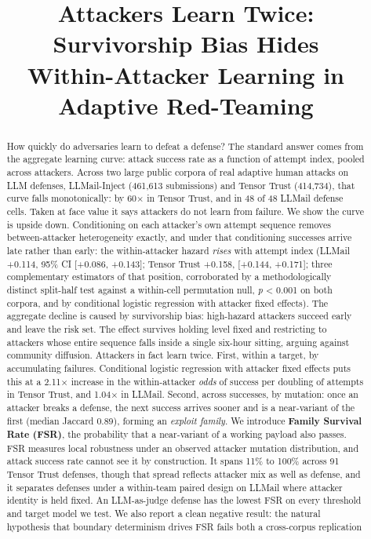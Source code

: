 \documentclass[conference]{IEEEtran}
\begin{document}
\title{Attackers Learn Twice: Survivorship Bias Hides\\ Within-Attacker Learning in Adaptive Red-Teaming}

\author{
}

\maketitle

\begin{abstract}
How quickly do adversaries learn to defeat a defense? The standard answer comes from the aggregate learning curve: attack success rate as a function of attempt index, pooled across attackers. Across two large public corpora of real adaptive human attacks on LLM defenses, LLMail-Inject (461,613 submissions) and Tensor Trust (414,734), that curve falls monotonically: by 60$\times$ in Tensor Trust, and in 48 of 48 LLMail defense cells. Taken at face value it says attackers do not learn from failure. We show the curve is upside down. Conditioning on each attacker's own attempt sequence removes between-attacker heterogeneity exactly, and under that conditioning successes arrive late rather than early: the within-attacker hazard \textit{rises} with attempt index (LLMail +0.114, 95\% CI [+0.086, +0.143]; Tensor Trust +0.158, [+0.144, +0.171]; three complementary estimators of that position, corroborated by a methodologically distinct split-half test against a within-cell permutation null, \textit{p} \textless{} 0.001 on both corpora, and by conditional logistic regression with attacker fixed effects). The aggregate decline is caused by survivorship bias: high-hazard attackers succeed early and leave the risk set. The effect survives holding level fixed and restricting to attackers whose entire sequence falls inside a single six-hour sitting, arguing against community diffusion. Attackers in fact learn twice. First, within a target, by accumulating failures. Conditional logistic regression with attacker fixed effects puts this at a 2.11$\times$ increase in the within-attacker \textit{odds} of success per doubling of attempts in Tensor Trust, and 1.04$\times$ in LLMail. Second, across successes, by mutation: once an attacker breaks a defense, the next success arrives sooner and is a near-variant of the first (median Jaccard 0.89), forming an \textit{exploit family}. We introduce \textbf{Family Survival Rate (FSR)}, the probability that a near-variant of a working payload also passes. FSR measures local robustness under an observed attacker mutation distribution, and attack success rate cannot see it by construction. It spans 11\% to 100\% across 91 Tensor Trust defenses, though that spread reflects attacker mix as well as defense, and it separates defenses under a within-team paired design on LLMail where attacker identity is held fixed. An LLM-as-judge defense has the lowest FSR on every threshold and target model we test. We also report a clean negative result: the natural hypothesis that boundary determinism drives FSR fails both a cross-corpus replication 
\end{abstract}
\end{document}
